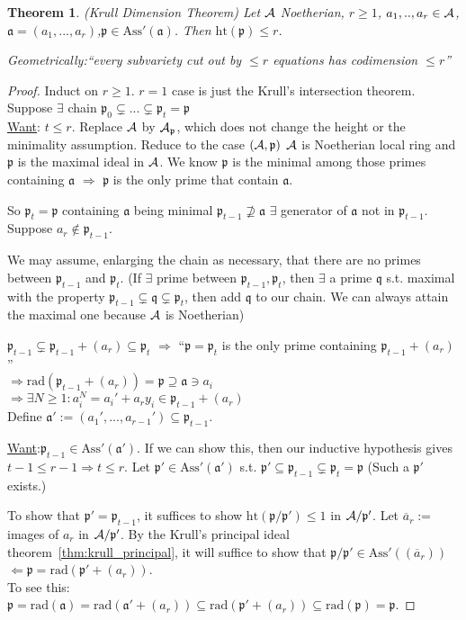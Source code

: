 \documentclass[11pt]{article}
\newtheorem{thm}{Theorem}[section]
\newcommand{\sca}{{\mathfrak a}}
\newcommand{\scp}{{\mathfrak p}}
\newcommand{\scq}{\mathfrak q}
\newcommand{\cala}{{\cal A}}
\newcommand{\Lrta}{\Longrightarrow}
\newcommand{\Llta}{\Longleftarrow}
\begin{document}
\begin{thm}\label{thm:Krull_dimension}
(Krull Dimension Theorem)
Let $\cala$ Noetherian, $r\geq 1$, $a_1,..,a_r\in\cala$, $\sca=(a_1,...,a_r)$,$\scp\in \text{Ass}'(\sca)$. Then $\text{ht}(\scp)\leq r$.

Geometrically:``every subvariety cut out by $\leq r$ equations has codimension $\leq r$''

\end{thm}
\begin{proof}
Induct on $r\geq 1$. $r=1$ case is just the Krull's intersection theorem. Suppose $\exists $ chain $\scp_0\subsetneq...\subsetneq\scp_t=\scp$\\
\underline{Want}: $t\leq r$. Replace $\cala$ by $\cala_\scp$, which does not change the height or the minimality assumption. Reduce to the case $(\cala,\scp)$ $\cala$ is Noetherian local ring and $\scp$ is the maximal ideal in $\cala$. We know $\scp$ is the minimal among those primes containing $\sca$ $\Lrta$ $\scp$ is the only prime that contain $\sca$.

So $\scp_t=\scp$ containing $\sca$ being minimal $\scp_{t-1}\nsupseteq\sca$ $\exists $ generator of $\sca$ not in $\scp_{t-1}$. Suppose $a_r\notin\scp_{t-1}$.

We may assume, enlarging the chain as necessary, that there are no primes between $\scp_{t-1}$ and $\scp_t$. (If $\exists$ prime between $\scp_{t-1},\scp_t$, then $\exists$ a prime $\scq$ s.t. maximal with the property $\scp_{t-1}\subsetneq \scq\subsetneq \scp_t$, then add $\scq$ to our chain. We can always attain the maximal one because $\cala$ is Noetherian)

$\scp_{t-1}\subsetneq \scp_{t-1}+(a_r)\subseteq\scp_t$ $\Lrta$ ``$\scp=\scp_t$ is the only prime containing $\scp_{t-1}+(a_r)$''\\
$\Lrta\text{rad}(\scp_{t-1}+(a_r))=\scp\supseteq \sca\ni a_i$\\
$\Lrta\exists N\geq 1: a_i^N=a_i'+a_r y_i\in \scp_{t-1}+(a_r)$\\
Define $\sca':=(a_1',...,a_{r-1}')\subseteq \scp_{t-1}$.

\underline{Want}:$\scp_{t-1}\in \text{Ass}'(\sca')$. If we can show this, then our inductive hypothesis gives $t-1\leq r-1\Lrta t\leq r$. Let $\scp'\in \text{Ass}'(\sca')$ s.t. $\scp'\subseteq \scp_{t-1}\subsetneq \scp_t=\scp$ (Such a $\scp'$ exists.)

To show that $\scp'=\scp_{t-1}$, it suffices to show $\text{ht}(\scp/\scp')\leq 1$ in $\cala/\scp'$. Let $\overline{a}_r:=$ images of $a_r$ in $\cala/\scp'$.
By the Krull's principal ideal theorem~\ref{thm:krull_principal}, it will suffice to show that 
$\scp/\scp'\in \text{Ass}'((\overline{a}_r))$ $\Llta \scp=\text{rad}(\scp'+(a_r))$.\\
To see this:\\
$\scp=\text{rad}(\sca)=\text{rad}(\sca'+(a_r))\subseteq \text{rad}(\scp'+(a_r))\subseteq\text{rad}(\scp)= \scp$.
\end{proof}
\end{document}
